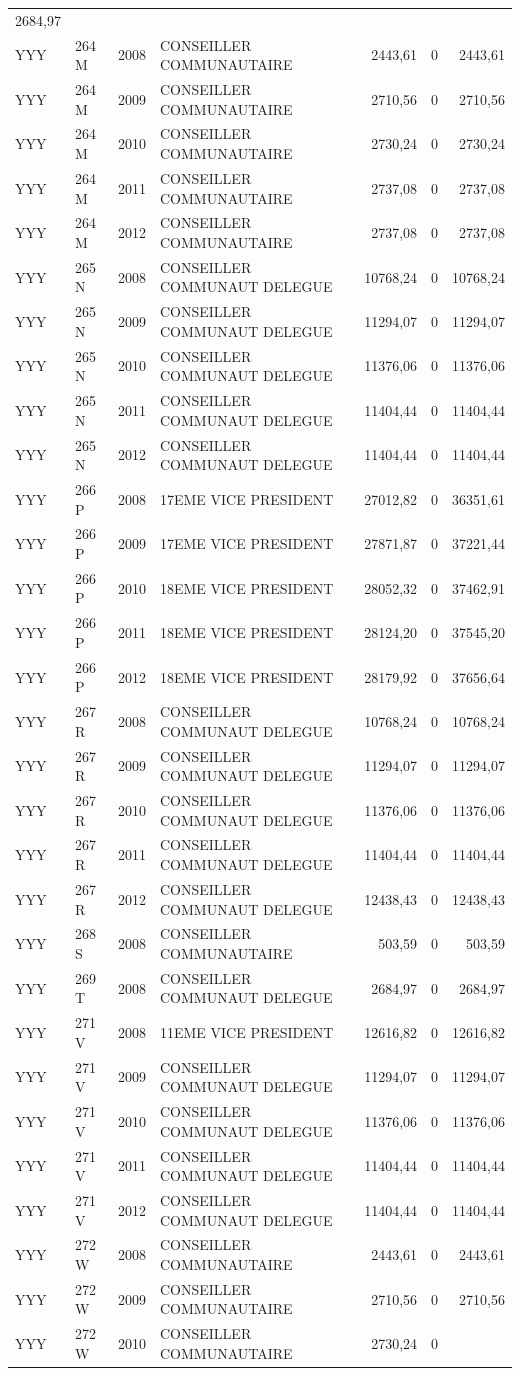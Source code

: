 \begin{longtable}[]{@{}llrlrrr@{}}
2684,97\tabularnewline
YYY & 264 M & 2008 & CONSEILLER COMMUNAUTAIRE & 2443,61 & 0 &
2443,61\tabularnewline
YYY & 264 M & 2009 & CONSEILLER COMMUNAUTAIRE & 2710,56 & 0 &
2710,56\tabularnewline
YYY & 264 M & 2010 & CONSEILLER COMMUNAUTAIRE & 2730,24 & 0 &
2730,24\tabularnewline
YYY & 264 M & 2011 & CONSEILLER COMMUNAUTAIRE & 2737,08 & 0 &
2737,08\tabularnewline
YYY & 264 M & 2012 & CONSEILLER COMMUNAUTAIRE & 2737,08 & 0 &
2737,08\tabularnewline
YYY & 265 N & 2008 & CONSEILLER COMMUNAUT DELEGUE & 10768,24 & 0 &
10768,24\tabularnewline
YYY & 265 N & 2009 & CONSEILLER COMMUNAUT DELEGUE & 11294,07 & 0 &
11294,07\tabularnewline
YYY & 265 N & 2010 & CONSEILLER COMMUNAUT DELEGUE & 11376,06 & 0 &
11376,06\tabularnewline
YYY & 265 N & 2011 & CONSEILLER COMMUNAUT DELEGUE & 11404,44 & 0 &
11404,44\tabularnewline
YYY & 265 N & 2012 & CONSEILLER COMMUNAUT DELEGUE & 11404,44 & 0 &
11404,44\tabularnewline
YYY & 266 P & 2008 & 17EME VICE PRESIDENT & 27012,82 & 0 &
36351,61\tabularnewline
YYY & 266 P & 2009 & 17EME VICE PRESIDENT & 27871,87 & 0 &
37221,44\tabularnewline
YYY & 266 P & 2010 & 18EME VICE PRESIDENT & 28052,32 & 0 &
37462,91\tabularnewline
YYY & 266 P & 2011 & 18EME VICE PRESIDENT & 28124,20 & 0 &
37545,20\tabularnewline
YYY & 266 P & 2012 & 18EME VICE PRESIDENT & 28179,92 & 0 &
37656,64\tabularnewline
YYY & 267 R & 2008 & CONSEILLER COMMUNAUT DELEGUE & 10768,24 & 0 &
10768,24\tabularnewline
YYY & 267 R & 2009 & CONSEILLER COMMUNAUT DELEGUE & 11294,07 & 0 &
11294,07\tabularnewline
YYY & 267 R & 2010 & CONSEILLER COMMUNAUT DELEGUE & 11376,06 & 0 &
11376,06\tabularnewline
YYY & 267 R & 2011 & CONSEILLER COMMUNAUT DELEGUE & 11404,44 & 0 &
11404,44\tabularnewline
YYY & 267 R & 2012 & CONSEILLER COMMUNAUT DELEGUE & 12438,43 & 0 &
12438,43\tabularnewline
YYY & 268 S & 2008 & CONSEILLER COMMUNAUTAIRE & 503,59 & 0 &
503,59\tabularnewline
YYY & 269 T & 2008 & CONSEILLER COMMUNAUT DELEGUE & 2684,97 & 0 &
2684,97\tabularnewline
YYY & 271 V & 2008 & 11EME VICE PRESIDENT & 12616,82 & 0 &
12616,82\tabularnewline
YYY & 271 V & 2009 & CONSEILLER COMMUNAUT DELEGUE & 11294,07 & 0 &
11294,07\tabularnewline
YYY & 271 V & 2010 & CONSEILLER COMMUNAUT DELEGUE & 11376,06 & 0 &
11376,06\tabularnewline
YYY & 271 V & 2011 & CONSEILLER COMMUNAUT DELEGUE & 11404,44 & 0 &
11404,44\tabularnewline
YYY & 271 V & 2012 & CONSEILLER COMMUNAUT DELEGUE & 11404,44 & 0 &
11404,44\tabularnewline
YYY & 272 W & 2008 & CONSEILLER COMMUNAUTAIRE & 2443,61 & 0 &
2443,61\tabularnewline
YYY & 272 W & 2009 & CONSEILLER COMMUNAUTAIRE & 2710,56 & 0 &
2710,56\tabularnewline
YYY & 272 W & 2010 & CONSEILLER COMMUNAUTAIRE & 2730,24 & 0 &

\end{longtable}
